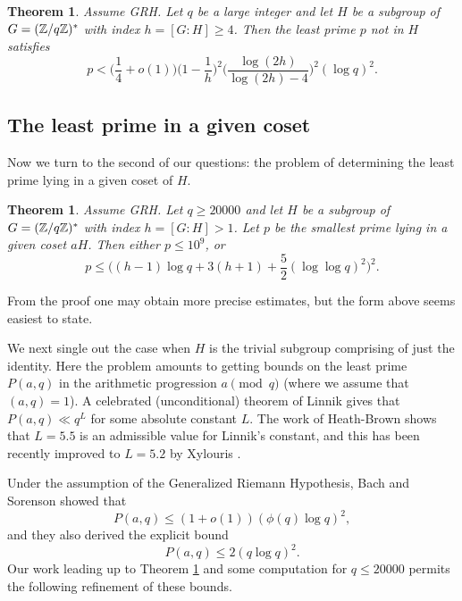 \documentclass [12pt]{amsart}
\newtheorem{Theorem}[thm]{Theorem}
\numberwithin{equation}{section}
\begin{document}
\begin{Theorem}\label{thmtheoretical2}
Assume GRH.  Let $q$ be a large integer and let $H$ be a subgroup 
of $G=({\Bbb Z}/q{\Bbb Z})^*$ with index $h=[G:H]\ge 4$.  Then the least prime $p$ not in $H$ satisfies 
$$
p < \Big(\frac 14+o(1)\Big) \Big(1-\frac 1h\Big)^2 \Big(\frac{\log (2h)}{\log (2h)-4}\Big)^2 (\log q)^2.
$$
\end{Theorem}
  
 

\subsection{The least prime in a given coset}  Now we turn to the second of 
our questions: the problem of determining the least prime lying in a given coset 
of $H$.  


\begin{Theorem}\label{thmcoset}
Assume GRH.  Let $q\geq 20000$ and let $H$ be a subgroup of $G=({\Bbb Z}/q{\Bbb Z})^*$ with index $h=[G:H]>1$.  Let $p$ be the smallest prime lying in a given coset $aH$.  Then either $p \leq 10^9$, or
$$p\leq \Big((h-1)\log q + 3(h+1) + \frac 52(\log\log q)^2\Big)^2.$$  
\end{Theorem}

From the proof one may obtain more precise estimates, but the 
form above seems easiest to state.  

We next single out the case when $H$ is the trivial subgroup comprising of just the identity.  Here the problem amounts to getting bounds on the least prime $P(a,q)$ in the
arithmetic progression $a\pmod q$ (where we assume that $(a,q)=1$).  
A celebrated (unconditional) theorem of  Linnik  gives that $P(a,q)\ll q^{L}$ 
for some absolute constant $L$.  The work of  Heath-Brown \cite{HB} shows that $L=5.5$ is an admissible value for Linnik's constant, and this has been recently improved to $L=5.2$ by Xylouris \cite{Xy}.

Under the assumption of the Generalized Riemann Hypothesis, Bach and Sorenson \cite{Bach2} showed that
\begin{equation}\label{BachSorenson1}
P(a,q)\leq (1+o(1))(\phi(q)\log q)^2,
\end{equation}
and they also derived the explicit bound
\begin{equation}\label{BachSorenson2}
P(a,q)\leq 2(q\log q)^2.
\end{equation}
Our work leading up to Theorem \ref{thmcoset} and some computation for $q\leq 20000$ permits the following refinement of these bounds.  
 
\end{document}

